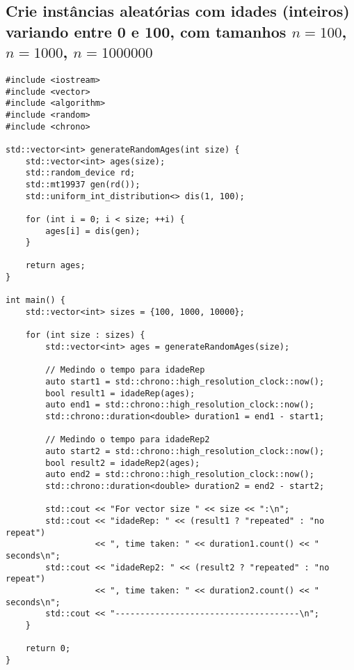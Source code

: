 \subsection{Crie instâncias aleatórias com idades (inteiros) variando entre 0 e 100, com tamanhos \( n = 100 \), \( n = 1000 \), \( n = 1000000 \)}

\begin{verbatim}
#include <iostream>
#include <vector>
#include <algorithm>
#include <random>
#include <chrono>

std::vector<int> generateRandomAges(int size) {
    std::vector<int> ages(size);
    std::random_device rd;
    std::mt19937 gen(rd());
    std::uniform_int_distribution<> dis(1, 100);

    for (int i = 0; i < size; ++i) {
        ages[i] = dis(gen);
    }

    return ages;
}

int main() {
    std::vector<int> sizes = {100, 1000, 10000};

    for (int size : sizes) {
        std::vector<int> ages = generateRandomAges(size);

        // Medindo o tempo para idadeRep
        auto start1 = std::chrono::high_resolution_clock::now();
        bool result1 = idadeRep(ages);
        auto end1 = std::chrono::high_resolution_clock::now();
        std::chrono::duration<double> duration1 = end1 - start1;

        // Medindo o tempo para idadeRep2
        auto start2 = std::chrono::high_resolution_clock::now();
        bool result2 = idadeRep2(ages);
        auto end2 = std::chrono::high_resolution_clock::now();
        std::chrono::duration<double> duration2 = end2 - start2;

        std::cout << "For vector size " << size << ":\n";
        std::cout << "idadeRep: " << (result1 ? "repeated" : "no repeat") 
                  << ", time taken: " << duration1.count() << " seconds\n";
        std::cout << "idadeRep2: " << (result2 ? "repeated" : "no repeat") 
                  << ", time taken: " << duration2.count() << " seconds\n";
        std::cout << "-------------------------------------\n";
    }

    return 0;
}


\end{verbatim}
